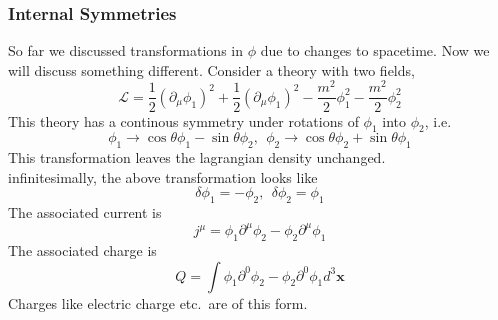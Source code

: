 \documentclass[11pt, notitlepage]{report}
\newcommand{\del}{\partial}
\newcommand{\ld}{\mathcal{L}}
\numberwithin{equation}{section}
\begin{document}
    \subsubsection{Internal Symmetries}
    So far we discussed transformations in \(\phi\) due to changes to spacetime. Now we will discuss something different. Consider a theory with two fields, 
    \begin{equation*}
        \ld = \frac{1}{2} (\del_\mu \phi_1)^2 + \frac{1}{2} (\del_\mu \phi_1)^2 - \frac{m^2}{2} \phi_1^2-\frac{m^2}{2} \phi_2^2
    \end{equation*} 
    This theory has a continous symmetry under rotations of \(\phi_1\) into \(\phi_2\), i.e. 
    \begin{equation*}
        \phi_1 \to \cos\theta \phi_1 - \sin\theta \phi_2,~~ \phi_2\to \cos\theta \phi_2 + \sin\theta \phi_1
    \end{equation*}
    This transformation leaves the lagrangian density unchanged. \\
    infinitesimally, the above transformation looks like 
    \begin{equation*}
        \delta \phi_1 = - \phi_2,~~\delta \phi_2 = \phi_1
    \end{equation*}
    The associated current is 
    \begin{equation*}
        j^\mu =  \phi_1 \del^\mu \phi_2 - \phi_2 \del^\mu \phi_1
    \end{equation*}
    The associated charge is 
    \begin{equation*}
        Q = \int \phi_1 \del^0 \phi_2 - \phi_2 \del^0 \phi_1 d^3\textbf{x}
    \end{equation*}
    Charges like electric charge etc.\ are of this form. \\
\end{document}
